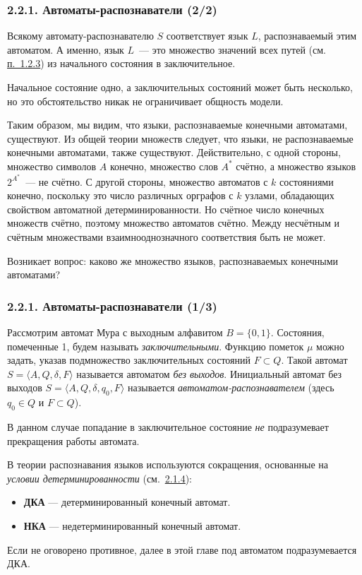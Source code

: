 \documentclass[mathserif,12pt,aspectratio=169]{beamer}
\def\emразделенной{\em разделенной}
\renewcommand{\index}[1]{}
\def\em#1{\it\color{blue}#1}
\def\odmkey#1#2{{\it\color{red} #1}\index{#2}}
\def\DMref#1#2{{\color{blue}\underline{\hyperlink{#2}{#1}}}}
\begin{document}
\begin{frame}
\frametitle{2.2.1. Автоматы-распознаватели (2/2)}
Всякому автомату-распознавателю $S$ соответствует язык $L$,
распознаваемый этим автоматом. А именно, язык $L$~--- это
множество значений всех путей (см. \DMref{п.~1.2.3}{1.2.3.}) из начального состояния в
заключительное.
\begin{remark}
Начальное состояние одно, а заключительных состояний может быть несколько,
но это обстоятельство никак не ограничивает общность модели.
\end{remark}

\smallskip
Таким образом, мы видим, что языки, распознаваемые конечными
автоматами, существуют. Из общей теории множеств следует, что
языки, не распознаваемые конечными автоматами, также существуют.
Действительно, с одной стороны, множество символов $A$ конечно,
множество слов $A^*$  счётно, а множество языков $2^{A^*}$~--- не
счётно. С другой стороны, множество автоматов с $k$ состояниями
конечно, поскольку это число различных орграфов с $k$ узлами,
обладающих свойством автоматной детерминированности. Но счётное
число конечных множеств счётно, поэтому множество автоматов
счётно. Между несчётным и счётным множествами взаимнооднозначного
соответствия быть не может.

\medskip
Возникает вопрос: каково же множество языков, распознаваемых
конечными автоматами?

\end{frame}

\begin{frame}
\frametitle{2.2.1. Автоматы-распознаватели (1/3)}

Рассмотрим автомат Мура с выходным алфавитом $B=\{0,1\}$.
Состояния, помеченные 1, будем называть
\odmkey{заключительными}{Состояние!заключительное}. Функцию
пометок $\mu$ можно задать, указав подмножество заключительных состояний $F\subset Q$.
Такой автомат $S=\langle A, Q, \delta, F
\rangle$ называется автоматом \odmkey{без выходов}{Автомат!без
выходов}. Инициальный автомат без выходов $S=\langle A, Q, \delta,
q_0, F\rangle$ называется
\odmkey{автоматом-распознавателем}{Автомат!распознаватель}
(здесь $q_0\in Q$ и $F\subset Q$).

\begin{remark}
В данном случае попадание в заключительное состояние {\em не}
подразумевает прекращения работы автомата.
\end{remark}

\medskip
В теории распознавания языков используются сокращения, основанные на 
\odmkey{условии детерминированности}{Условие!детерминированности} (см.~\DMref{2.1.4}{2.1.4.}):
\begin{itemize}
    \item \textbf{ДКА} --- детерминированный конечный автомат.
    \item \textbf{НКА} --- недетерминированный конечный автомат.
\end{itemize}
Если не оговорено противное, далее в этой главе
под автоматом подразумевается ДКА.
\end{frame}
\end{document}
